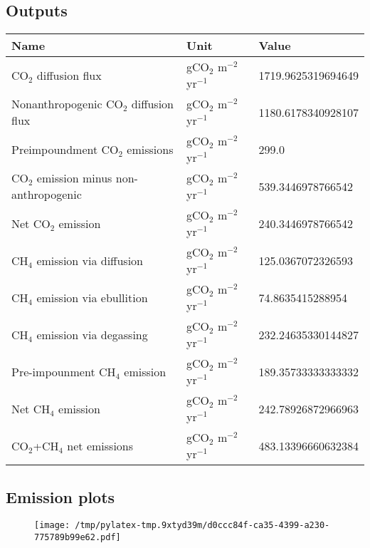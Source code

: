 \documentclass{article}%
\begin{document}
%
\subsection{Outputs}%
\label{subsec:Outputs}%
\begin{center}%
\renewcommand{\arraystretch}{1.0}%
\begin{tabu}{@{}p{10cm} X[c] X[l]@{}}%
\toprule%
\textbf{Name}&\textbf{Unit}&\textbf{Value}\\%
\midrule%
CO$_2$ diffusion flux&gCO$_2$ m$^{-2}$ yr$^{-1}$&\num[round-precision=4,round-mode=figures]{1719.9625319694649}\\%
Nonanthropogenic CO$_2$ diffusion flux&gCO$_2$ m$^{-2}$ yr$^{-1}$&\num[round-precision=4,round-mode=figures]{1180.6178340928107}\\%
Preimpoundment CO$_2$ emissions&gCO$_2$ m$^{-2}$ yr$^{-1}$&\num[round-precision=4,round-mode=figures]{299.0}\\%
CO$_2$ emission minus non-anthropogenic&gCO$_2$ m$^{-2}$ yr$^{-1}$&\num[round-precision=4,round-mode=figures]{539.3446978766542}\\%
Net CO$_2$ emission&gCO$_2$ m$^{-2}$ yr$^{-1}$&\num[round-precision=4,round-mode=figures]{240.3446978766542}\\%
CH$_4$ emission via diffusion&gCO$_2$ m$^{-2}$ yr$^{-1}$&\num[round-precision=4,round-mode=figures]{125.0367072326593}\\%
CH$_4$ emission via ebullition&gCO$_2$ m$^{-2}$ yr$^{-1}$&\num[round-precision=4,round-mode=figures]{74.8635415288954}\\%
CH$_4$ emission via degassing&gCO$_2$ m$^{-2}$ yr$^{-1}$&\num[round-precision=4,round-mode=figures]{232.24635330144827}\\%
Pre-impounment CH$_4$ emission&gCO$_2$ m$^{-2}$ yr$^{-1}$&\num[round-precision=4,round-mode=figures]{189.35733333333332}\\%
Net CH$_4$ emission&gCO$_2$ m$^{-2}$ yr$^{-1}$&\num[round-precision=4,round-mode=figures]{242.78926872966963}\\%
\midrule%
CO$_2$+CH$_4$ net emissions&gCO$_2$ m$^{-2}$ yr$^{-1}$&\num[round-precision=4,round-mode=figures]{483.13396660632384}\\\bottomrule%
%
\end{tabu}%
\end{center}%
\subsection{Emission plots}%
\label{subsec:Emissionplots}%


\begin{figure}[htbp]%
\centering%
\texttt{[image: /tmp/pylatex-tmp.9xtyd39m/d0ccc84f-ca35-4399-a230-775789b99e62.pdf]}%
\end{figure}

%
\end{document}
